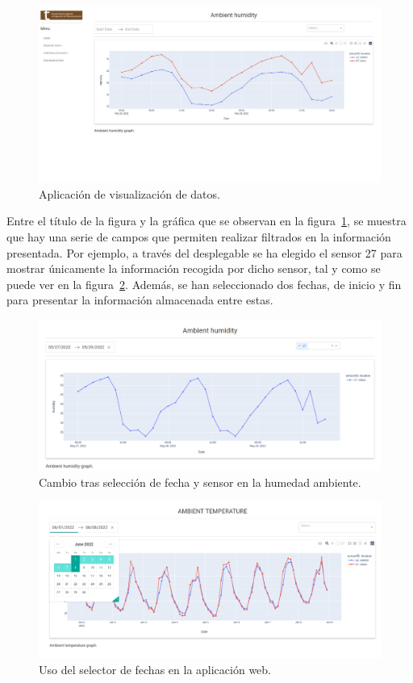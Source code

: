 \documentclass[a4paper, 12pt, oneside]{book}
\begin{document}
\begin{figure}[H]
	\centering
    \includegraphics[width=12cm, keepaspectratio]{img/humedad_ambiente_grafica}
    \caption{Aplicación de visualización de datos.}
    \label{figura:humedad_ambiente_grafica}
\end{figure}

Entre el título de la figura y la gráfica que se observan en la figura~\ref{figura:humedad_ambiente_grafica}, se muestra que hay una serie de campos que permiten realizar filtrados en la información presentada. Por ejemplo, a través del desplegable se ha elegido el sensor 27 para mostrar únicamente la información recogida por dicho sensor, tal y como se puede ver en la figura~\ref{figura:humedad_ambiente_grafica_selectores}. Además, se han seleccionado dos fechas, de inicio y fin para presentar la información almacenada entre estas.

\begin{figure}[H]
	\centering
    \includegraphics[width=12cm, keepaspectratio]{img/humedad_ambiente_valores}
    \caption{Cambio tras selección de fecha y sensor en la humedad ambiente.}
    \label{figura:humedad_ambiente_grafica_selectores}
\end{figure}

\begin{figure}[H]
	\centering
    \includegraphics[width=12cm, keepaspectratio]{img/desplegable_fecha}
    \caption{Uso del selector de fechas en la aplicación web.}
    \label{figura:desplegable_fecha}
\end{figure}
\end{document}
